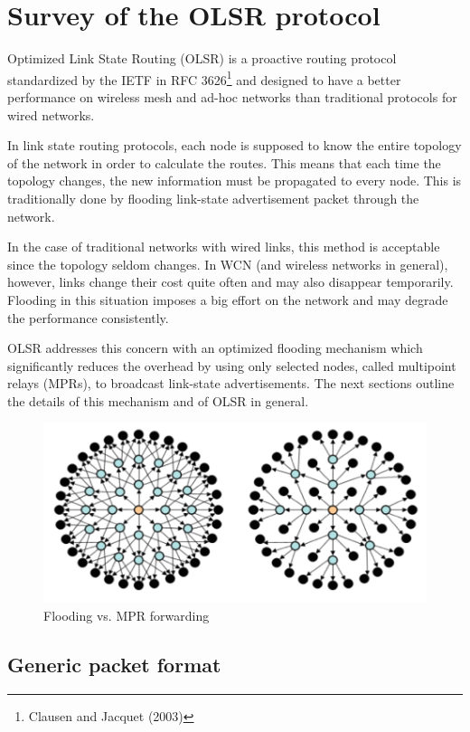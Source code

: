 \documentclass[a4paper,11pt,twoside,openleft]{memoir}
\begin{document}
\chapter{Survey of the OLSR protocol}\label{olsr-survey}

Optimized Link State Routing (OLSR) is a proactive routing protocol
standardized by the IETF in RFC 3626\footnote{Clausen and Jacquet (2003)}
and designed to have a better performance on wireless mesh and ad-hoc
networks than traditional protocols for wired networks.

In link state routing protocols, each node is supposed to know the
entire topology of the network in order to calculate the routes. This
means that each time the topology changes, the new information must be
propagated to every node. This is traditionally done by flooding
link-state advertisement packet through the network.

In the case of traditional networks with wired links, this method is
acceptable since the topology seldom changes. In WCN (and wireless
networks in general), however, links change their cost quite often and
may also disappear temporarily. Flooding in this situation imposes a big
effort on the network and may degrade the performance consistently.

OLSR addresses this concern with an optimized flooding mechanism which
significantly reduces the overhead by using only selected nodes, called
multipoint relays (MPRs), to broadcast link-state advertisements. The
next sections outline the details of this mechanism and of OLSR in
general.

\begin{figure}[htbp]
\centering
\includegraphics{images/mpr.png}
\caption{Flooding vs. MPR forwarding}
\end{figure}

\section{Generic packet format}\label{generic-packet-format}
\end{document}
